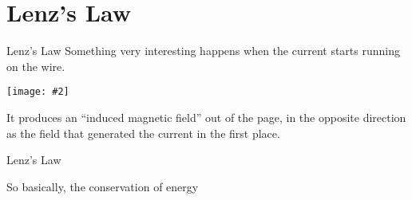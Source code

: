 \documentclass[12pt,aspectratio=169]{beamer}
\newcommand{\pic}[2]{\texttt{[image: \#2]}}
\begin{document}
\section{Lenz's Law}

\begin{frame}{Lenz's Law}
  Something very interesting happens when the current starts running on the
  wire.
  \begin{center}
    \pic{.35}{motional-emf-2}
  \end{center}
  It produces an ``induced magnetic field'' out of the page, in the opposite
  direction as the field that generated the current in the first place.
\end{frame}



\begin{frame}{Lenz's Law}
  \begin{center}
  \end{center}

  \vspace{.2in}So basically, the conservation of energy
\end{frame}
\end{document}
